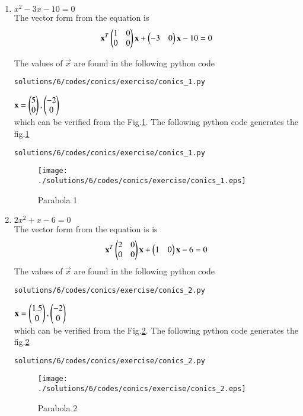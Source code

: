 \begin{enumerate}

\item $x^2-3x-10=0$  \\
The vector form from the equation is 
\begin{align}
\mathbf{x}^T\begin{pmatrix}1&0\\0&0\end{pmatrix}\mathbf{x}+\begin{pmatrix}-3&0\end{pmatrix}\mathbf{x}-10=0
\end{align}

The values of $\vec{x}$ are found in the following python code
\begin{lstlisting}
solutions/6/codes/conics/exercise/conics_1.py
\end{lstlisting}

$\mathbf{x}=\begin{pmatrix}5\\0\end{pmatrix}, \begin{pmatrix}-2\\0\end{pmatrix}$ \\
which can be verified from the Fig.\ref{fig:5.2.6_parabola_1}.
The following python code generates the fig.\ref{fig:5.2.6_parabola_1}
\begin{lstlisting}
solutions/6/codes/conics/exercise/conics_1.py
\end{lstlisting}
\begin{figure}[!ht]
\texttt{[image: ./solutions/6/codes/conics/exercise/conics\_1.eps]}
\caption{Parabola 1}
\label{fig:5.2.6_parabola_1}
\end{figure} 

\item $2x^2+x-6=0$ \\
The vector form from the equation is is
\begin{align}
\mathbf{x}^T\begin{pmatrix}2&0\\0&0\end{pmatrix}\mathbf{x}+\begin{pmatrix}1&0\end{pmatrix}\mathbf{x}-6
=0
\end{align}
The values of $\vec{x}$ are found in the following python code
\begin{lstlisting}
solutions/6/codes/conics/exercise/conics_2.py
\end{lstlisting}

$\mathbf{x}=\begin{pmatrix}1.5\\0\end{pmatrix}, \begin{pmatrix}-2\\0\end{pmatrix}$ \\
which can be verified from the Fig.\ref{fig:5.2.6_parabola_2}.
The following python code generates the fig.\ref{fig:5.2.6_parabola_2}
\begin{lstlisting}
solutions/6/codes/conics/exercise/conics_2.py
\end{lstlisting}
\begin{figure}[!ht]
\texttt{[image: ./solutions/6/codes/conics/exercise/conics\_2.eps]}
\caption{Parabola 2}
\label{fig:5.2.6_parabola_2}
\end{figure} 


\end{enumerate}
